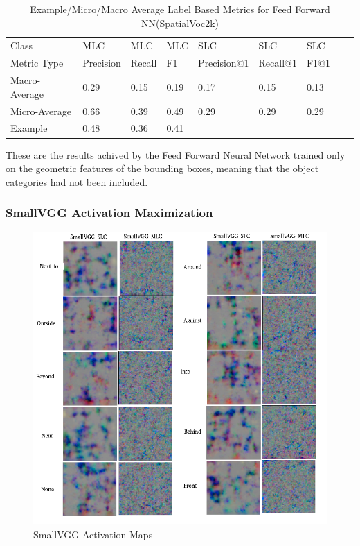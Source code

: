 \documentclass{csfyp}
\begin{document}
\begin{table}[!htbp]
\begin{tabular}{|l|l|l|l|l|l|l|l|l}
Class &  MLC  &  MLC  &  MLC & SLC &  SLC & SLC \\ \cline{1-7}
Metric Type  & Precision &  Recall & F1 & Precision@1 & Recall@1 & F1@1 \\ \cline{1-7}
Macro-Average &	0.29	&	0.15	&	0.19	&	0.17	&	0.15	&	0.13\\ \cline{1-7}
Micro-Average &	0.66	&	0.39	&	0.49	&	0.29	&	0.29	&	0.29 \\ \cline{1-7}
Example       &	0.48	&	0.36	&	0.41 \\ \cline{1-4}
\end{tabular}
\caption{Example/Micro/Macro Average Label Based Metrics for Feed Forward NN(SpatialVoc2k)}
These are the results achived by the Feed Forward Neural Network trained only on the geometric features of the bounding boxes, meaning that the object categories had not been included.
\vspace{-4mm}
\end{table}

\subsubsection{SmallVGG Activation Maximization}
\newpage
\begin{figure}[!htbp]
	\includegraphics[scale=0.60,center]{Small_Spatial.pdf}
	\caption{SmallVGG Activation Maps}
\end{figure}
\end{document}

